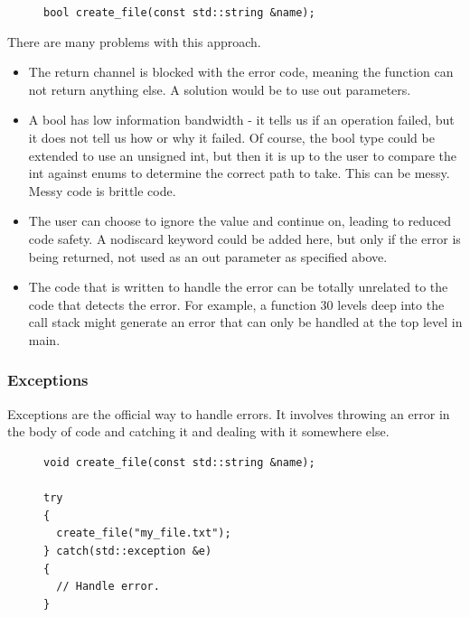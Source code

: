 \documentclass[12pt]{report}
\theoremstyle{definition}
\begin{document}
          \begin{figure}[h]
            \centering
            \verb|bool create_file(const std::string &name);|
          \end{figure}

          There are many problems with this approach.

          \begin{itemize}
            \item The return channel is blocked with the error code, meaning
              the function can not return anything else. A solution would be to
              use out parameters.
            \item A bool has low information bandwidth - it tells us if an
              operation failed, but it does not tell us how or why it failed.
              Of course, the bool type could be extended to use an unsigned int,
              but then it is up to the user to compare the int against enums to
              determine the correct path to take. This can be messy. Messy code
              is brittle code.
            \item The user can choose to ignore the value and continue on,
              leading to reduced code safety. A nodiscard keyword could be
              added here, but only if the error is being returned, not used
              as an out parameter as specified above.
            \item The code that is written to handle the error can be totally
              unrelated to the code that detects the error. For example, a
              function 30 levels deep into the call stack might generate an
              error that can only be handled at the top level in main.
          \end{itemize}

        \subsubsection{Exceptions}

          Exceptions are the official way to handle errors. It involves
          throwing an error in the body of code and catching it and dealing
          with it somewhere else.

          \begin{figure}[h]
            \centering
            \begin{verbatim}
void create_file(const std::string &name);

try
{
  create_file("my_file.txt");
} catch(std::exception &e)
{
  // Handle error.
}
            \end{verbatim}
          \end{figure}
\end{document}

